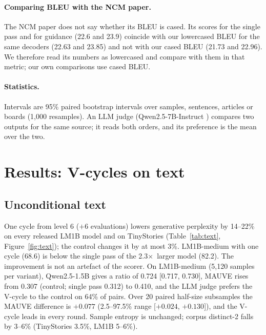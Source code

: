\documentclass[11pt]{article}
\newcommand{\x}{$\times$}
\begin{document}
\paragraph{Comparing BLEU with the NCM paper.} The NCM paper does not say whether its BLEU is cased. Its scores for
the single pass and for guidance (22.6 and 23.9) coincide with our lowercased BLEU for the same decoders (22.63 and
23.85) and not with our cased BLEU (21.73 and 22.96). We therefore read its numbers as lowercased and compare with
them in that metric; our own comparisons use cased BLEU.

\paragraph{Statistics.} Intervals are 95\% paired bootstrap intervals over samples, sentences, articles or boards
(1,000 resamples). An LLM judge (Qwen2.5-7B-Instruct \citep{qwen25}) compares two outputs for the same source; it reads both
orders, and its preference is the mean over the two.

\section{Results: V-cycles on text}
\label{sec:vcycles}

\subsection{Unconditional text}

One cycle from level 6 ($+6$ evaluations) lowers generative perplexity by 14--22\% on every released LM1B model and on
TinyStories (Table~\ref{tab:text}, Figure~\ref{fig:text}); the control changes it by at most 3\%. LM1B-medium with one
cycle (68.6) is below the single pass of the 2.3\x\ larger model (82.2). The improvement is not an artefact of the
scorer. On LM1B-medium (5,120 samples per variant), Qwen2.5-1.5B gives a ratio of 0.724 [0.717, 0.730], MAUVE rises
from 0.307 (control; single pass 0.312) to 0.410, and the LLM judge prefers the V-cycle to the control on 64\% of
pairs. Over 20
paired half-size subsamples the MAUVE difference is $+0.077$ (2.5--97.5\% range [$+0.024$, $+0.130$]), and the V-cycle
leads in every round. Sample entropy is unchanged; corpus distinct-2 falls by 3--6\% (TinyStories 3.5\%, LM1B
5--6\%).
\end{document}
